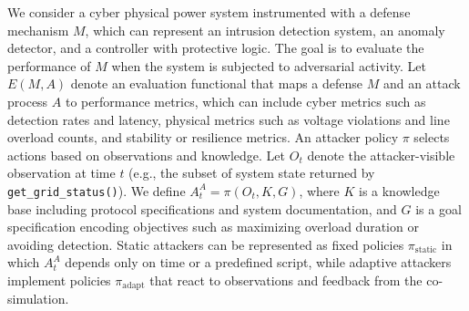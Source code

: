 

We consider a cyber physical power system instrumented with a defense mechanism \(M\), which can represent an intrusion detection system, an anomaly detector, and a controller with protective logic. The goal is to evaluate the performance of \(M\) when the system is subjected to adversarial activity. Let \(E(M, A)\) denote an evaluation functional that maps a defense \(M\) and an attack process \(A\) to performance metrics, which can include cyber metrics such as detection rates and latency, physical metrics such as voltage violations and line overload counts, and stability or resilience metrics.
%
An attacker policy \(\pi\) selects actions based on observations and knowledge. Let \(O_t\) denote the attacker-visible observation at time \(t\) (e.g., the subset of system state returned by \texttt{get\_grid\_status()}). We define \(A^A_t = \pi(O_t, K, G)\), where \(K\) is a knowledge base including protocol specifications and system documentation, and \(G\) is a goal specification encoding objectives such as maximizing overload duration or avoiding detection. Static attackers can be represented as fixed policies \(\pi_{\text{static}}\) in which \(A^A_t\) depends only on time or a predefined script, while adaptive attackers implement policies \(\pi_{\text{adapt}}\) that react to observations and feedback from the co-simulation. 

